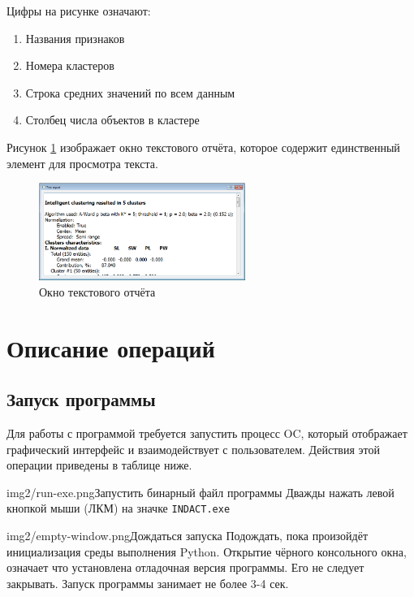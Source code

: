 \documentclass[12pt,tikz]{instruction}
\begin{document}
Цифры на рисунке означают:
\begin{enumerate}
	\item Названия признаков
	\item Номера кластеров
	\item Строка средних значений по всем данным
	\item Столбец числа объектов в кластере
\end{enumerate}
Рисунок \ref{fig:text-report} изображает окно текстового отчёта, которое содержит единственный элемент для просмотра текста.
\begin{figure}[H]
	\centering
	\includegraphics[width=0.6\textwidth]{img2/text-report.png}
	\caption{Окно текстового отчёта}
	\label{fig:text-report}
\end{figure}

\newpage
\section{Описание операций}

\subsection{Запуск программы}
Для работы с программой требуется запустить процесс OC, который отображает графический интерфейс и взаимодействует с пользователем. Действия этой операции приведены в таблице ниже.

\begin{steps}
	\begin{ist}{img2/run-exe.png}{Запустить бинарный файл программы}
		Дважды нажать левой кнопкой мыши (ЛКМ) на значке \texttt{INDACT.exe}
	\end{ist}
	\begin{ist}{img2/empty-window.png}{Дождаться запуска}
		Подождать, пока произойдёт инициализация среды выполнения Python. Открытие чёрного консольного окна, означает что установлена отладочная версия программы. Его не следует закрывать. Запуск программы занимает не более 3-4 сек.   
	\end{ist}
\end{steps}
	
\end{document}

